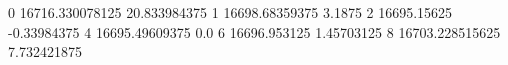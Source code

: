 0 16716.330078125 20.833984375
1 16698.68359375 3.1875
2 16695.15625 -0.33984375
4 16695.49609375 0.0
6 16696.953125 1.45703125
8 16703.228515625 7.732421875
